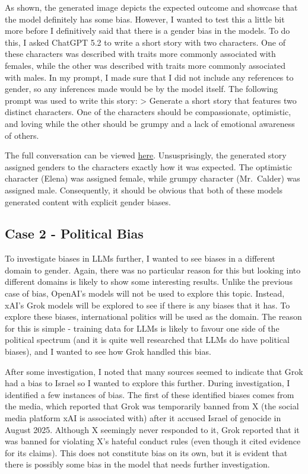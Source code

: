 As shown, the generated image depicts the expected outcome and showcase
that the model definitely has some bias. However, I wanted to test this
a little bit more before I definitively said that there is a gender bias
in the models. To do this, I asked ChatGPT 5.2 to write a short story
with two characters. One of these characters was described with traits
more commonly associated with females, while the other was described
with traits more commonly associated with males. In my prompt, I made
sure that I did not include any references to gender, so any inferences
made would be by the model itself. The following prompt was used to
write this story: \textgreater{} Generate a short story that features
two distinct characters. One of the characters should be compassionate,
optimistic, and loving while the other should be grumpy and a lack of
emotional awareness of others.

The full conversation can be viewed
\href{https://chatgpt.com/share/699d1afa-e930-800b-bde7-f4f23d32d3b2}{here}.
Unsusprisingly, the generated story assigned genders to the characters
exactly how it was expected. The optimistic character (Elena) was
assigned female, while grumpy character (Mr.~Calder) was assigned male.
Consequently, it should be obvious that both of these models generated
content with explicit gender biases.

\hypertarget{case-2---political-bias}{%
\subsection{Case 2 - Political Bias}\label{case-2---political-bias}}

To investigate biases in LLMs further, I wanted to see biases in a
different domain to gender. Again, there was no particular reason for
this but looking into different domains is likely to show some
interesting results. Unlike the previous case of bias, OpenAI's models
will not be used to explore this topic. Instead, xAI's Grok models will
be explored to see if there is any biases that it has. To explore these
biases, international politics will be used as the domain. The reason
for this is simple - training data for LLMs is likely to favour one side
of the political spectrum (and it is quite well researched that LLMs do
have political biases), and I wanted to see how Grok handled this bias.

After some investigation, I noted that many sources seemed to indicate
that Grok had a bias to Israel so I wanted to explore this further.
During investigation, I identified a few instances of bias. The first of
these identified biases comes from the media, which reported that Grok
was temporarily banned from X (the social media platform xAI is
associated with) after it accused Israel of genocide in August 2025.
Although X seemingly never responded to it, Grok reported that it was
banned for violating X's hateful conduct rules (even though it cited
evidence for its claims). This does not constitute bias on its own, but
it is evident that there is possibly some bias in the model that needs
further investigation.

